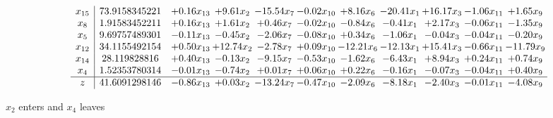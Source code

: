 \documentclass[9pt]{article}
\begin{document}
 \[\begin{array}{c| c c@{\hskip 2pt} c@{\hskip 2pt} c@{\hskip 2pt} c@{\hskip 2pt} c@{\hskip 2pt} c@{\hskip 2pt} c@{\hskip 2pt} c@{\hskip 2pt} c@{\hskip 2pt} }
 x_{15}   &  73.9158345221 & +  0.16 x_{13} & +  9.61 x_{2} & -15.54 x_{7} & -0.02 x_{10} & +  8.16 x_{6} & -20.41 x_{1} & + 16.17 x_{3} & -1.06 x_{11} & +  1.65 x_{9}\\
 x_{8}   &  1.91583452211 & +  0.16 x_{13} & +  1.61 x_{2} & +  0.46 x_{7} & -0.02 x_{10} & -0.84 x_{6} & -0.41 x_{1} & +  2.17 x_{3} & -0.06 x_{11} & -1.35 x_{9}\\
 x_{5}   &  9.69757489301 & -0.11 x_{13} & -0.45 x_{2} & -2.06 x_{7} & -0.08 x_{10} & +  0.34 x_{6} & -1.06 x_{1} & -0.04 x_{3} & -0.04 x_{11} & -0.20 x_{9}\\
 x_{12}   &  34.1155492154 & +  0.50 x_{13} & + 12.74 x_{2} & -2.78 x_{7} & +  0.09 x_{10} & -12.21 x_{6} & -12.13 x_{1} & + 15.41 x_{3} & -0.66 x_{11} & -11.79 x_{9}\\
 x_{14}   &  28.119828816 & +  0.40 x_{13} & -0.13 x_{2} & -9.15 x_{7} & -0.53 x_{10} & -1.62 x_{6} & -6.43 x_{1} & +  8.94 x_{3} & +  0.24 x_{11} & +  0.74 x_{9}\\
 x_{4}   &  1.52353780314 & -0.01 x_{13} & -0.74 x_{2} & +  0.01 x_{7} & +  0.06 x_{10} & +  0.22 x_{6} & -0.16 x_{1} & -0.07 x_{3} & -0.04 x_{11} & +  0.40 x_{9}\\
\hline
z    &  41.6091298146 & -0.86 x_{13} & +  0.03 x_{2} & -13.24 x_{7} & -0.47 x_{10} & -2.09 x_{6} & -8.18 x_{1} & -2.40 x_{3} & -0.01 x_{11} & -4.08 x_{9}\\
\end{array}\]


 $ x_{2} $ enters and $ x_{4} $ leaves 
\end{document}
